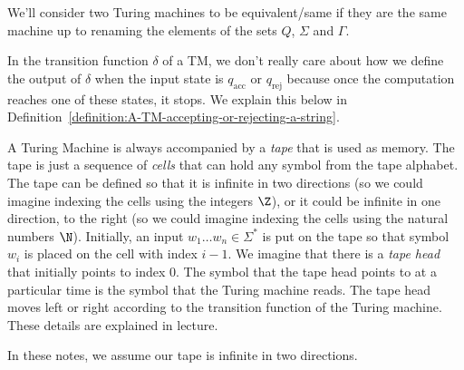 \begin{note}
\label{note:Equivalence-of-Turing-machines}
We'll consider two Turing machines to be equivalent/same if they are the same machine up to renaming the elements of the sets $Q$, $\Sigma$ and $\Gamma$.

\end{note}

\begin{note}
\label{note:No-transition-out-of-accepting-and-rejecting-states}
In the transition function $\delta$ of a TM, we don't really care about how we define the output of $\delta$ when the input state is $q_\text{acc}$ or $q_\text{rej}$ because once the computation reaches one of these states, it stops. We explain this below in Definition~\ref{definition:A-TM-accepting-or-rejecting-a-string}.

\end{note}

\begin{important}
\label{important:A-Turing-machine-uses-a-tape}
A Turing Machine is always accompanied by a \emph{tape} that is used as memory. The tape is just a sequence of \emph{cells} that can hold any symbol from the tape alphabet. The tape can be defined so that it is infinite in two directions (so we could imagine indexing the cells using the integers $\Z$), or it could be infinite in one direction, to the right (so we could imagine indexing the cells using the natural numbers $\N$). Initially, an input $w_1\ldots w_n \in \Sigma^*$ is put on the tape so that symbol $w_i$ is placed on the cell with index $i-1$. We imagine that there is a \emph{tape head} that initially points to index 0. The symbol that the tape head points to at a particular time is the symbol that the Turing machine reads. The tape head moves left or right according to the transition function of the Turing machine. These details are explained in lecture.

In these notes, we assume our tape is infinite in two directions. 

\end{important}

